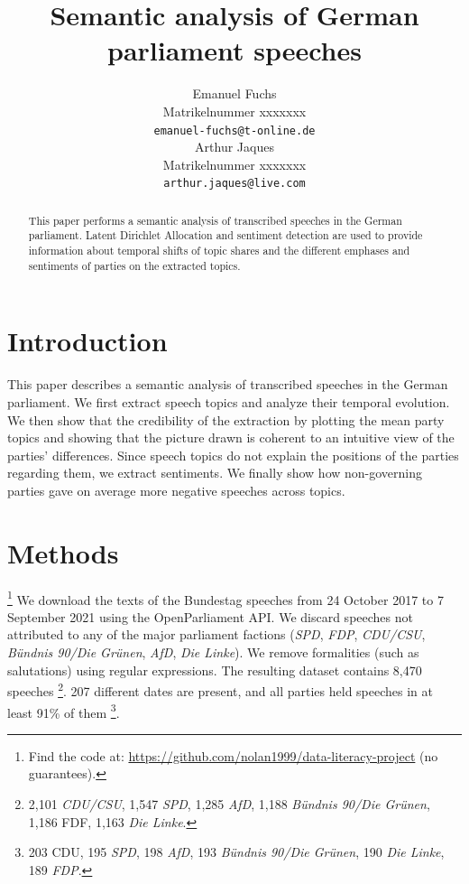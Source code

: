 \documentclass{article}
\title{Semantic analysis of German parliament speeches}
\author{%
  Emanuel Fuchs\\
  Matrikelnummer xxxxxxx\\
  \texttt{emanuel-fuchs@t-online.de} \\
  \And
  Arthur Jaques\\
  Matrikelnummer xxxxxxx\\
  \texttt{arthur.jaques@live.com} \\
}
\begin{document}
\maketitle


\begin{abstract}
  This paper performs a semantic analysis of transcribed speeches in the German parliament.
  Latent Dirichlet Allocation and sentiment detection are used to provide information about temporal shifts of topic shares and the different emphases and sentiments of parties on the extracted topics. 
\end{abstract}


\section{Introduction}
This paper describes a semantic analysis of transcribed speeches in the German parliament. 
We first extract speech topics and analyze their temporal evolution.
We then show that the credibility of the extraction by plotting the mean party topics and showing that the picture drawn is coherent to an intuitive view of the parties' differences.
Since speech topics do not explain the positions of the parties regarding them, we extract sentiments.
We finally show how non-governing parties gave on average more negative speeches across topics.


\section{Methods}\footnote{Find the code at: \url{https://github.com/nolan1999/data-literacy-project} (no guarantees).}
We download the texts of the Bundestag speeches from 24 October 2017 to 7 September 2021 using the OpenParliament \cite{OpenParliamentTV} API.
We discard speeches not attributed to any of the major parliament factions (\textit{SPD}, \textit{FDP}, \textit{CDU/CSU}, \textit{Bündnis 90/Die Grünen}, \textit{AfD}, \textit{Die Linke}).
We remove formalities (such as salutations) using regular expressions.
The resulting dataset contains 8,470 speeches
\footnote{2,101 \textit{CDU/CSU}, 1,547 \textit{SPD}, 1,285 \textit{AfD}, 1,188 \textit{Bündnis 90/Die Grünen}, 1,186 FDF, 1,163 \textit{Die Linke}.}.
207 different dates are present, and all parties held speeches in at least 91\% of them
\footnote{203 CDU, 195 \textit{SPD}, 198 \textit{AfD}, 193 \textit{Bündnis 90/Die Grünen}, 190 \textit{Die Linke}, 189 \textit{FDP}.}.
\end{document}
